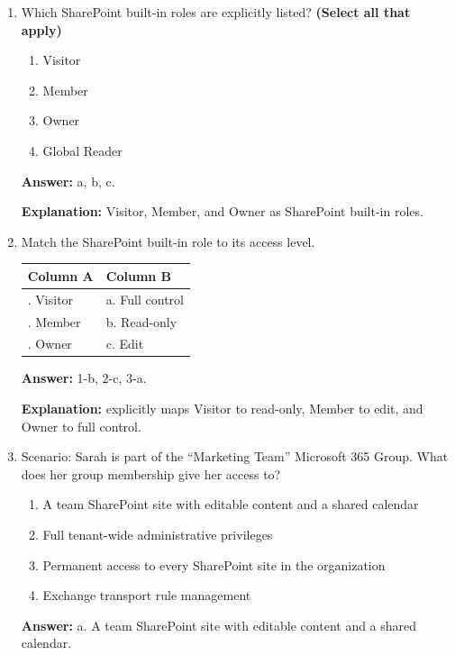 \documentclass[10pt]{article}
\begin{document}
\begin{enumerate}[leftmargin=*]
\textbf{Answer:} False.

\textbf{Explanation:} these permissions aren’t tied to global administrative roles, but to specific resources.

\item Which SharePoint built-in roles are explicitly listed? \textbf{(Select all that apply)}
\begin{enumerate}[label=\alph*., leftmargin=1.5em]
\item Visitor
\item Member
\item Owner
\item Global Reader
\end{enumerate}
\textbf{Answer:} a, b, c.

\textbf{Explanation:} Visitor, Member, and Owner as SharePoint built-in roles.

\item Match the SharePoint built-in role to its access level.

\begin{center}
\begin{tabular}{>{\raggedright\arraybackslash}p{} >{\raggedright\arraybackslash}p{}}
\toprule
\textbf{Column A} & \textbf{Column B} \\
\midrule
1. Visitor & a. Full control \\
2. Member & b. Read-only \\
3. Owner & c. Edit \\
\bottomrule
\end{tabular}
\end{center}

\textbf{Answer:} 1-b, 2-c, 3-a.

\textbf{Explanation:} explicitly maps Visitor to read-only, Member to edit, and Owner to full control.

\item Scenario: Sarah is part of the ``Marketing Team'' Microsoft 365 Group. What does her group membership give her access to?
\begin{enumerate}[label=\alph*., leftmargin=1.5em]
\item A team SharePoint site with editable content and a shared calendar
\item Full tenant-wide administrative privileges
\item Permanent access to every SharePoint site in the organization
\item Exchange transport rule management
\end{enumerate}
\textbf{Answer:} a. A team SharePoint site with editable content and a shared calendar.


\end{enumerate}
\end{document}
